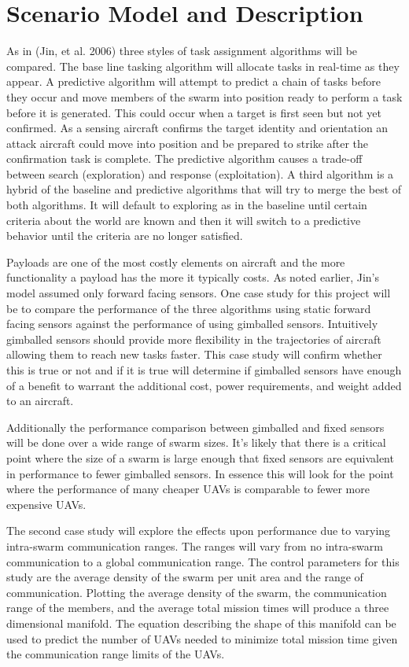 \chapter{Scenario Model and Description}

As in (Jin, et al. 2006) three styles of task assignment algorithms will be compared.  The base line tasking algorithm will allocate tasks in real-time as they appear.   A predictive algorithm will attempt to predict a chain of tasks before they occur and move members of the swarm into position ready to perform a task before it is generated.  This could occur when a target is first seen but not yet confirmed.   As a sensing aircraft confirms the target identity and orientation an attack aircraft could move into position and be prepared to strike after the confirmation task is complete.  The predictive algorithm causes a trade-off between search (exploration) and response (exploitation).  A third algorithm is a hybrid of the baseline and predictive algorithms that will try to merge the best of both algorithms.  It will default to exploring as in the baseline until certain criteria about the world are known and then it will switch to a predictive behavior until the criteria are no longer satisfied.

Payloads are one of the most costly elements on aircraft and the more functionality a payload has the more it typically costs.  As noted earlier, Jin’s model assumed only forward facing sensors.  One case study for this project will be to compare the performance of the three algorithms using static forward facing sensors against the performance of using gimballed sensors.  Intuitively gimballed sensors should provide more flexibility in the trajectories of aircraft allowing them to reach new tasks faster.  This case study will confirm whether this is true or not and if it is true will determine if gimballed sensors have enough of a benefit to warrant the additional cost, power requirements, and weight added to an aircraft.  

Additionally the performance comparison between gimballed and fixed sensors will be done over a wide range of swarm sizes.  It’s likely that there is a critical point where the size of a swarm is large enough that fixed sensors are equivalent in performance to fewer gimballed sensors.  In essence this will look for the point where the performance of many cheaper UAVs is comparable to fewer more expensive UAVs.

The second case study will explore the effects upon performance due to varying intra-swarm communication ranges.  The ranges will vary from no intra-swarm communication to a global communication range.  The control parameters for this study are the average density of the swarm per unit area and the range of communication.  Plotting the average density of the swarm, the communication range of the members, and the average total mission times will produce a three dimensional manifold.  The equation describing the shape of this manifold can be used to predict the number of UAVs needed to minimize total mission time given the communication range limits of the UAVs.

